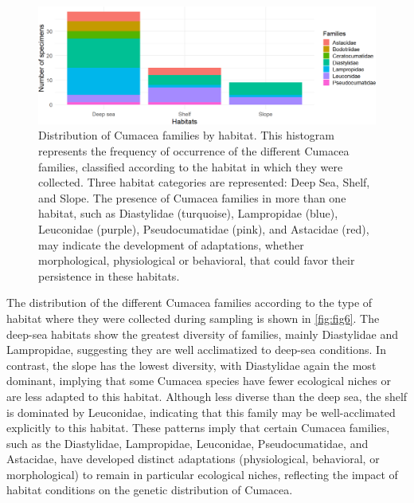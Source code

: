 \begin{figure}[htbp]
    \centering
    \includegraphics[width=\textwidth]{figure4.png}
    \caption{Distribution of Cumacea families by habitat. This histogram represents the frequency of occurrence of the different Cumacea families, classified according to the habitat in which they were collected. Three habitat categories are represented: Deep Sea, Shelf, and Slope. The presence of Cumacea families in more than one habitat, such as Diastylidae (turquoise), Lampropidae (blue), Leuconidae (purple), Pseudocumatidae (pink), and Astacidae (red), may indicate the development of adaptations, whether morphological, physiological or behavioral, that could favor their persistence in these habitats. \label{fig:fig6}}
\end{figure}

The distribution of the different Cumacea families according to the type of habitat where they were collected during sampling is shown in \autoref{fig:fig6}. The deep-sea habitats show the greatest diversity of families, mainly Diastylidae and Lampropidae, suggesting they are well acclimatized to deep-sea conditions. In contrast, the slope has the lowest diversity, with Diastylidae again the most dominant, implying that some Cumacea species have fewer ecological niches or are less adapted to this habitat. Although less diverse than the deep sea, the shelf is dominated by Leuconidae, indicating that this family may be well-acclimated explicitly to this habitat. These patterns imply that certain Cumacea families, such as the Diastylidae, Lampropidae, Leuconidae, Pseudocumatidae, and Astacidae, have developed distinct adaptations (physiological, behavioral, or morphological) to remain in particular ecological niches, reflecting the impact of habitat conditions on the genetic distribution of Cumacea.

